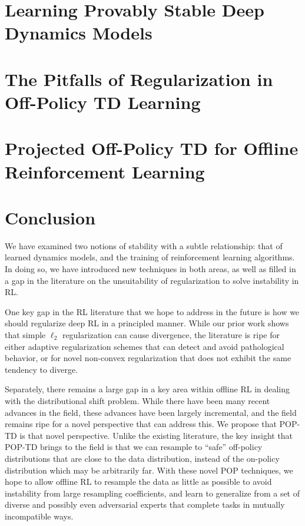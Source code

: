 \documentclass[12pt]{cmuthesis}
\begin{document}
\chapter[Learning Stable Dynamics Models]{Learning Provably Stable Deep Dynamics Models}



\chapter[The Pitfalls of Regularization in Off-Policy TD]{The Pitfalls of Regularization in Off-Policy TD Learning}



\chapter{Projected Off-Policy TD for Offline Reinforcement Learning}



\backmatter{}
\chapter{Conclusion}

We have examined two notions of stability with a subtle relationship: that of learned dynamics models, and the training of reinforcement learning algorithms. In doing so, we have introduced new techniques in both areas, as well as filled in a gap in the literature on the unsuitability of regularization to solve instability in RL.

One key gap in the RL literature that we hope to address in the future is how we should regularize deep RL in a principled manner. While our prior work shows that simple $\ell_2$ regularization can cause divergence, the literature is ripe for either adaptive regularization schemes that can detect and avoid pathological behavior, or for novel non-convex regularization that does not exhibit the same tendency to diverge.

Separately, there remains a large gap in a key area within offline RL in dealing with the distributional shift problem. While there have been many recent advances in the field, these advances have been largely incremental, and the field remains ripe for a novel perspective that can address this. We propose that POP-TD is that novel perspective. Unlike the existing literature, the key insight that POP-TD brings to the field is that we can resample to ``safe'' off-policy distributions that are close to the data distribution, instead of the on-policy distribution which may be arbitrarily far. With these novel POP techniques, we hope to allow offline RL to resample the data as little as possible to avoid instability from large resampling coefficients, and learn to generalize from a set of diverse and possibly even adversarial experts that complete tasks in mutually incompatible ways.

\appendix


\printbibliography{}
\end{document}
